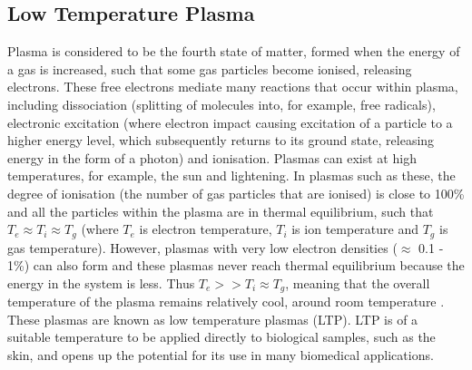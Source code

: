 \documentclass[11pt, oneside]{article}   	%
\begin{document}
\subsection*{Low Temperature Plasma}





Plasma is considered to be the fourth state of matter, formed when the energy of a gas is increased, such that some gas particles become ionised, releasing electrons. These free electrons mediate many reactions that occur within plasma, including dissociation (splitting of molecules into, for example, free radicals), electronic excitation (where electron impact causing excitation of a particle to a higher energy level, which subsequently returns to its ground state, releasing energy in the form of a photon) and ionisation. Plasmas can exist at high temperatures, for example, the sun and lightening. 
In plasmas such as these, the degree of ionisation (the number of gas particles that are ionised) is close to 100\% and all the particles within the plasma are in thermal equilibrium, such that $T_e \approx T_i \approx T_g$ (where $T_e$ is electron temperature, $T_i$ is ion temperature and $T_g$ is gas temperature).
However, plasmas with very low electron densities ($\approx$ 0.1 - 1\%) can also form and these plasmas never reach thermal equilibrium because the energy in the system is less. Thus $T_e >> T_i \approx T_g$, meaning that the overall temperature of the plasma remains relatively cool, around room temperature \cite{Fridman2013plasmamedicine, Moreau2008nonthermal}. These plasmas are known as low temperature plasmas (LTP). LTP is of a suitable temperature to be applied directly to biological samples, such as the skin, and opens up the potential for its use in many biomedical applications.
\end{document}

